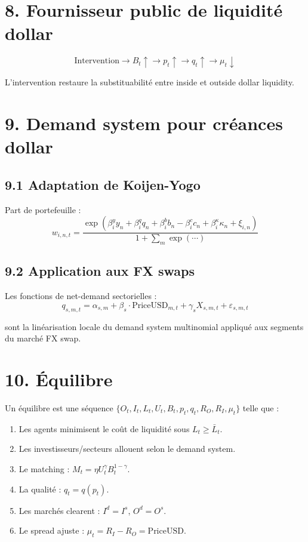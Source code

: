 \section*{8. Fournisseur public de liquidité dollar}

\[
\text{Intervention} \to B_t \uparrow \to p_t \uparrow \to q_t \uparrow \to \mu_t \downarrow
\]

L'intervention restaure la substituabilité entre inside et
outside dollar liquidity.

\section*{9. Demand system pour créances dollar}

\subsection*{9.1 Adaptation de Koijen-Yogo}

Part de portefeuille :
\begin{equation}
w_{i,n,t} = \frac{\exp(\beta_i^y y_n + \beta_i^q q_n + \beta_i^b b_n - \beta_i^c c_n + \beta_i^\kappa \kappa_n + \xi_{i,n})}{1 + \sum_m \exp(\cdots)}
\label{eq:demand-system}
\end{equation}

\subsection*{9.2 Application aux FX swaps}

Les fonctions de net-demand sectorielles :
\begin{equation}
q_{s,m,t} = \alpha_{s,m} + \beta_s \cdot \text{PriceUSD}_{m,t} + \gamma_s X_{s,m,t} + \varepsilon_{s,m,t}
\label{eq:net-demand}
\end{equation}

sont la linéarisation locale du demand system multinomial appliqué
aux segments du marché FX swap.

\section*{10. Équilibre}

Un équilibre est une séquence
$\{O_t, I_t, L_t, U_t, B_t, p_t, q_t, R_O, R_I, \mu_t\}$ telle que :

\begin{enumerate}
  \item Les agents minimisent le coût de liquidité sous $L_t \geq \bar{L}_t$.
  \item Les investisseurs/secteurs allouent selon le demand system.
  \item Le matching : $M_t = \eta U_t^{\gamma} B_t^{1-\gamma}$.
  \item La qualité : $q_t = q(p_t)$.
  \item Les marchés clearent : $I^d = I^s$, $O^d = O^s$.
  \item Le spread ajuste : $\mu_t = R_I - R_O = \text{PriceUSD}$.
\end{enumerate}

